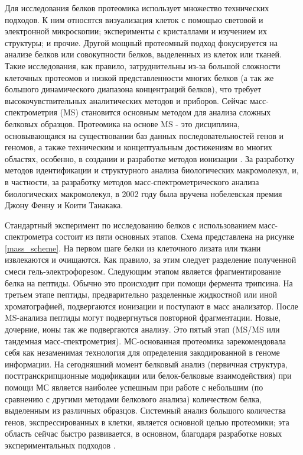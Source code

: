 Для исследования белков протеомика использует множество технических подходов. К ним относятся визуализация клеток с помощью световой и электронной микроскопии; эксперименты с кристаллами и изучением их структуры; и прочие. Другой мощный протеомный подход фокусируется на анализе  белков или совокупности белков, выделенных из клеток или тканей. Такие исследования, как правило, затруднительны из-за большой сложности клеточных протеомов и низкой представленности многих белков (а так же большого динамического диапазона концентраций белков), что требует высокочувствительных аналитических методов и приборов. Сейчас масс-спектрометрия (MS) становится основным методом для анализа сложных белковых образцов. Протеомика на основе MS - это дисциплина, основывающаяся на существовании баз данных последовательностей генов и геномов, а также техническим и концептуальным достижениям во многих областях, особенно, в создании и разработке методов ионизации \cite{aebersold2003mass}. За разработку методов идентификации и структурного анализа биологических макромолекул, и, в частности, за разработку методов масс-спектрометрического анализа биологических макромолекул, в 2002 году была вручена нобелевская премия Джону Фенну и Коити Танакака.

Стандартный эксперимент по исследованию белков с использованием масс-спектрометра состоит из пяти основных этапов. Схема представлена на рисунке \ref{mass_scheme}. На первом шаге белки из клеточного лизата или ткани извлекаются и очищаются. Как правило, за этим следует разделение полученной смеси гель-электрофорезом. Следующим этапом является фрагментирование белка на пептиды. Обычно это происходит при помощи фермента трипсина. На третьем этапе пептиды, предварительно разделенные жидкостной или иной хроматографией, подвергаются ионизации и поступают в масс анализатор. После MS-анализа пептиды могут подвергнуться повторной фрагментации. Новые, дочерние, ионы так же подвергаются анализу. Это пятый этап (MS/MS или тандемная масс-спектрометрия). МС-основанная протеомика зарекомендовала себя как незаменимая технология для определения закодированной в геноме информации. На сегодняшний момент белковый анализ (первичная структура, посттранскрипционные модификации или белок-белковые взаимодействия) при помощи МС является наиболее успешным при работе с небольшим (по сравнению с другими методами белкового анализа) количеством белка, выделенным из различных образцов. Системный анализ большого количества генов, экспрессированных в клетки, является основной целью протеомики; эта область сейчас быстро развивается, в основном, благодаря разработке новых экспериментальных подходов \cite{aebersold2003mass}.

